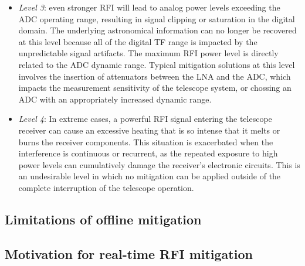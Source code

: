 \begin{itemize}
\item \emph{Level 3}: even stronger RFI will lead to analog power levels exceeding the ADC operating range, resulting in signal clipping or saturation in the digital domain. The underlying astronomical information can no longer be recovered at this level because all of the digital TF range is impacted by the unpredictable signal artifacts. The maximum RFI power level is directly related to the ADC dynamic range. Typical mitigation solutions at this level involves the insertion of attenuators between the LNA and the ADC, which impacts the measurement sensitivity of the telescope system, or chossing an ADC with an appropriately increased dynamic range.
\item \emph{Level 4}: In extreme cases, a powerful RFI signal entering the telescope receiver can cause an excessive heating that is so intense that it melts or burns the receiver components. This situation is exacerbated when the interference is continuous or recurrent, as the repeated exposure to high power levels can cumulatively damage the receiver's electronic circuits. This is an undesirable level in which no mitigation can be applied outside of the complete interruption of the telescope operation.
\end{itemize}

\subsection{Limitations of offline mitigation}
\label{subsection:hardware:introduction:limitations_offline}

\subsection{Motivation for real-time RFI mitigation}
\label{subsection:hardware:introduction:motivations}
